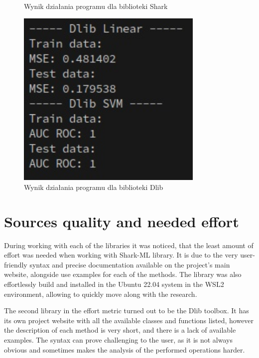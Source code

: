 \begin{figure}[!ht]
\begin{minipage}{0.31\textwidth}
		\caption{Wynik działania programu dla biblioteki Shark}
		\label{fig:shark_linear_svm2}		
	\end{minipage}%
	\hspace{0.02\textwidth}
	\begin{minipage}{0.31\textwidth}
		\centering
		\includegraphics[width=0.8\textwidth]{Rysunki/Rozdzial7/dlib_linear_svm}
		\caption{Wynik działania programu dla biblioteki Dlib}
		\label{fig:dlib_linear_svm2}
	\end{minipage}
\end{figure} 

\section{Sources quality and needed effort}

During working with each of the libraries it was noticed, that the least amount of effort was needed when working with Shark-ML library. It is due to the very user-friendly syntax and precise documentation available on the project's main website, alongside use examples for each of the methods. The library was also effortlessly build and installed in the Ubuntu 22.04 system in the WSL2 environment, allowing to quickly move along with the research.

The second library in the effort metric turned out to be the Dlib toolbox. It has its own project website with all the available classes and functions listed, however the description of each method is very short, and there is a lack of available examples. The syntax can prove challenging to the user, as it is not always obvious and sometimes makes the analysis of the performed operations harder.

